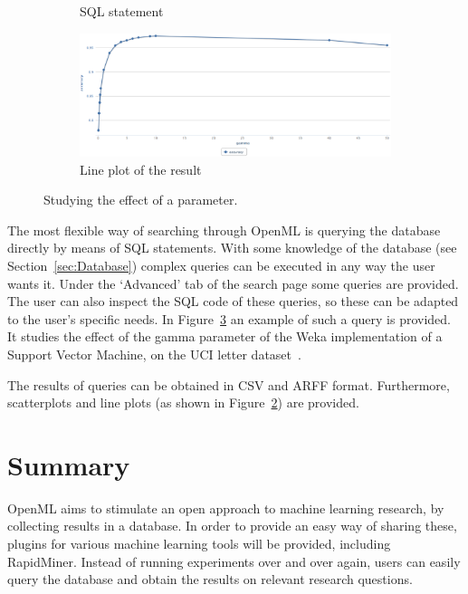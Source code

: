 \documentclass[10pt, twoside]{article}
\begin{document}
\begin{figure}[ht!]
	\centering
	\begin{subfigure}{\textwidth}
		
		\caption{SQL statement}
		\label{fig:comparesqlCode}
	\end{subfigure}
	\begin{subfigure}{.75\textwidth}
		\centering
		\includegraphics[width=\textwidth]{eps/learningcurve.eps}
		\caption{Line plot of the result}
		\label{fig:comparesqlLineplot}
	\end{subfigure}
	\caption{Studying the effect of a parameter.}
	\label{fig:comparesql}
\end{figure} 

The most flexible way of searching through OpenML is querying the database directly by means of SQL statements. With some knowledge of the database (see Section~\ref{sec:Database}) complex queries can be executed in any way the user wants it. Under the `Advanced' tab of the search page some queries are provided. The user can also inspect the SQL code of these queries, so these can be adapted to the user's specific needs. In Figure~\ref{fig:comparesql} an example of such a query is provided. It studies the effect of the gamma parameter of the Weka implementation of a Support Vector Machine, on the UCI letter dataset~\cite{frey1991}. 

The results of queries can be obtained in CSV and ARFF format. Furthermore, scatterplots and line plots (as shown in Figure~\ref{fig:comparesqlLineplot}) are provided. 

\section{Summary}
\label{sec:Summary}
OpenML aims to stimulate an open approach to machine learning research, by collecting results in a database. In order to provide an easy way of sharing these, plugins for various machine learning tools will be provided, including RapidMiner. Instead of running experiments over and over again, users can easily query the database and obtain the results on relevant research questions. 
\end{document}
